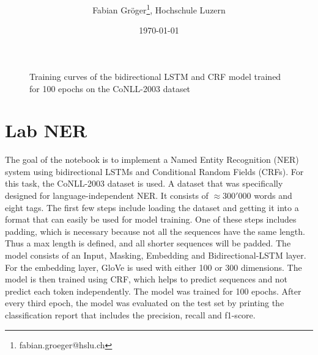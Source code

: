 \documentclass[onecolumn]{article}
\title{\vspace{-3cm}\spacecaps{Lab report: SW10 }\\ \normalsize \spacesc{TSM\_AnTeDe} }
\author{Fabian Gröger\thanks{fabian.groeger@hslu.ch}, Hochschule Luzern}
\date{\today}
\begin{document}
\maketitle

\begin{figure}[htb]
	\centering
	\caption{\label{fig:demo} Training curves of the bidirectional LSTM and CRF model trained for 100 epochs on the CoNLL-2003 dataset}
\end{figure}

\section{Lab NER}
The goal of the notebook is to implement a Named Entity Recognition (NER) system using bidirectional LSTMs and Conditional Random Fields (CRFs). For this task, the CoNLL-2003 dataset is used. A dataset that was specifically designed for language-independent NER. It consists of $\approx 300'000$ words and eight tags. The first few steps include loading the dataset and getting it into a format that can easily be used for model training. One of these steps includes padding, which is necessary because not all the sequences have the same length. Thus a max length is defined, and all shorter sequences will be padded. The model consists of an Input, Masking, Embedding and Bidirectional-LSTM layer. For the embedding layer, GloVe is used with either 100 or 300 dimensions. The model is then trained using CRF, which helps to predict sequences and not predict each token independently. The model was trained for 100 epochs. After every third epoch, the model was evaluated on the test set by printing the classification report that includes the precision, recall and f1-score.
\end{document}
